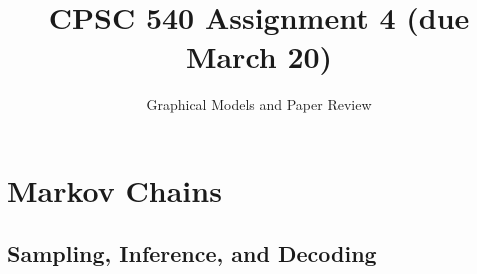 \documentclass{article}
\begin{document}
\def\blu#1{{\color{blu}#1}}
\def\gre#1{{\color{gre}#1}}
\def\red#1{{\color{red}#1}}
\def\norm#1{\|#1\|}
\newcommand{\argmin}[1]{\mathop{\hbox{argmin}}_{#1}}
\newcommand{\argmax}[1]{\mathop{\hbox{argmax}}_{#1}}
\def\R{\mathbb{R}}
\newcommand{\fig}[2]{\texttt{[image: a4f/\#2]}}
\newcommand{\centerfig}[2]{\begin{center}\texttt{[image: a4f/\#2]}\end{center}}
\def\items#1{\begin{itemize}#1\end{itemize}}
\def\enum#1{\begin{enumerate}#1\end{enumerate}}
\def\argmax{\mathop{\rm arg\,max}}
\def\argmin{\mathop{\rm arg\,min}}
\def\half{\frac 1 2}
\newcommand{\code}[1]{}
\newcommand{\alignStar}[1]{\begin{align*}#1\end{align*}}
\newcommand{\mat}[1]{\begin{bmatrix}#1\end{bmatrix}}
\newcommand{\p}{\mathbb{P}}


\title{CPSC 540 Assignment 4 (due March 20)}
\author{Graphical Models and Paper Review}
\date{}
\maketitle
{}

\section{Markov Chains}


\subsection{Sampling, Inference, and Decoding}
\end{document}
